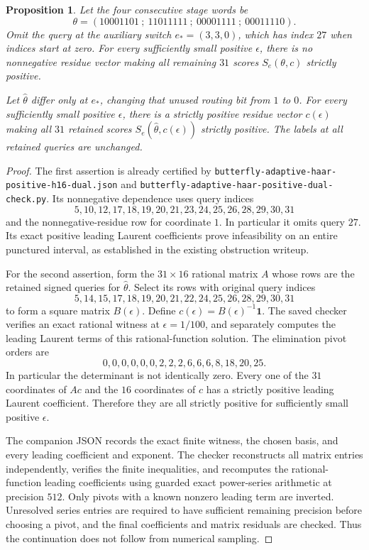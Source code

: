 \documentclass[11pt]{article}
\newtheorem{proposition}{Proposition}
\begin{document}
\begin{proposition}
Let the four consecutive stage words be
\[
 \theta=(10001101\ ;\ 11011111\ ;\ 00001111\ ;\ 00011110).
\]
Omit the query at the auxiliary switch $e_*=(3,3,0)$, which has index
$27$ when indices start at zero. For every sufficiently small positive
$\epsilon$, there is no nonnegative residue vector making all remaining
$31$ scores $S_e(\theta,c)$ strictly positive.

Let $\widehat\theta$ differ only at $e_*$, changing that unused routing
bit from $1$ to $0$. For every sufficiently small positive $\epsilon$,
there is a strictly positive residue vector $c(\epsilon)$ making all
$31$ retained scores $S_e(\widehat\theta,c(\epsilon))$ strictly positive.
The labels at all retained queries are unchanged.
\end{proposition}
\begin{proof}
The first assertion is already certified by
\texttt{butterfly-adaptive-haar-positive-h16-dual.json} and
\texttt{butterfly-adaptive-haar-positive-dual-check.py}.
Its nonnegative dependence uses query indices
\[
 5,10,12,17,18,19,20,21,23,24,25,26,28,29,30,31
\]
and the nonnegative-residue row for coordinate $1$. In particular it
omits query $27$. Its exact positive leading Laurent coefficients prove
infeasibility on an entire punctured interval, as established in the
existing obstruction writeup.

For the second assertion, form the $31\times16$ rational matrix $A$
whose rows are the retained signed queries for $\widehat\theta$.
Select its rows with original query indices
\[
 5,14,15,17,18,19,20,21,22,24,25,26,28,29,30,31
\]
to form a square matrix $B(\epsilon)$. Define
$c(\epsilon)=B(\epsilon)^{-1}\boldsymbol1$.
The saved checker verifies an exact rational witness at
$\epsilon=1/100$, and separately computes the leading Laurent terms
of this rational-function solution. The elimination pivot orders are
\[
 0,0,0,0,0,0,2,2,2,6,6,6,8,18,20,25.
\]
In particular the determinant is not identically zero. Every one of
the $31$ coordinates of $A c$ and the $16$ coordinates of $c$ has a
strictly positive leading Laurent coefficient. Therefore they are all
strictly positive for sufficiently small positive $\epsilon$.

The companion JSON records the exact finite witness, the chosen basis,
and every leading coefficient and exponent. The checker reconstructs
all matrix entries independently, verifies the finite inequalities,
and recomputes the rational-function leading coefficients using guarded
exact power-series arithmetic at precision $512$. Only pivots with a
known nonzero leading term are inverted. Unresolved series entries
are required to have sufficient remaining precision before choosing a
pivot, and the final coefficients and matrix residuals are checked.
Thus the continuation does not follow from numerical sampling.
\end{proof}
\end{document}
